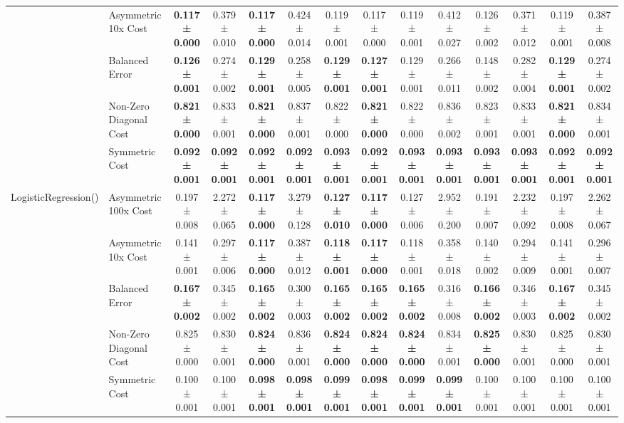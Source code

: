 \begin{table}[H]
{\begin{tabular}{llcccccccccccc}
 & Asymmetric 10x Cost & \textbf{0.117 ± 0.000} & 0.379 ± 0.010 & \textbf{0.117 ± 0.000} & 0.424 ± 0.014 & 0.119 ± 0.001 & 0.117 ± 0.000 & 0.119 ± 0.001 & 0.412 ± 0.027 & 0.126 ± 0.002 & 0.371 ± 0.012 & 0.119 ± 0.001 & 0.387 ± 0.008 \\
 & Balanced Error & \textbf{0.126 ± 0.001} & 0.274 ± 0.002 & \textbf{0.129 ± 0.001} & 0.258 ± 0.005 & \textbf{0.129 ± 0.001} & \textbf{0.127 ± 0.001} & 0.129 ± 0.001 & 0.266 ± 0.011 & 0.148 ± 0.002 & 0.282 ± 0.004 & \textbf{0.129 ± 0.001} & 0.274 ± 0.002 \\
 & Non-Zero Diagonal Cost & \textbf{0.821 ± 0.000} & 0.833 ± 0.001 & \textbf{0.821 ± 0.000} & 0.837 ± 0.001 & 0.822 ± 0.000 & \textbf{0.821 ± 0.000} & 0.822 ± 0.000 & 0.836 ± 0.002 & 0.823 ± 0.001 & 0.833 ± 0.001 & \textbf{0.821 ± 0.000} & 0.834 ± 0.001 \\
 & Symmetric Cost & \textbf{0.092 ± 0.001} & \textbf{0.092 ± 0.001} & \textbf{0.092 ± 0.001} & \textbf{0.092 ± 0.001} & \textbf{0.093 ± 0.001} & \textbf{0.092 ± 0.001} & \textbf{0.093 ± 0.001} & \textbf{0.093 ± 0.001} & \textbf{0.093 ± 0.001} & \textbf{0.093 ± 0.001} & \textbf{0.092 ± 0.001} & \textbf{0.092 ± 0.001} \\
\cline{1-14}
\multirow[t]{5}{*}{LogisticRegression()} & Asymmetric 100x Cost & 0.197 ± 0.008 & 2.272 ± 0.065 & \textbf{0.117 ± 0.000} & 3.279 ± 0.128 & \textbf{0.127 ± 0.010} & \textbf{0.117 ± 0.000} & 0.127 ± 0.006 & 2.952 ± 0.200 & 0.191 ± 0.007 & 2.232 ± 0.092 & 0.197 ± 0.008 & 2.262 ± 0.067 \\
 & Asymmetric 10x Cost & 0.141 ± 0.001 & 0.297 ± 0.006 & \textbf{0.117 ± 0.000} & 0.387 ± 0.012 & \textbf{0.118 ± 0.001} & \textbf{0.117 ± 0.000} & 0.118 ± 0.001 & 0.358 ± 0.018 & 0.140 ± 0.002 & 0.294 ± 0.009 & 0.141 ± 0.001 & 0.296 ± 0.007 \\
 & Balanced Error & \textbf{0.167 ± 0.002} & 0.345 ± 0.002 & \textbf{0.165 ± 0.002} & 0.300 ± 0.003 & \textbf{0.165 ± 0.002} & \textbf{0.165 ± 0.002} & \textbf{0.165 ± 0.002} & 0.316 ± 0.008 & \textbf{0.166 ± 0.002} & 0.346 ± 0.003 & \textbf{0.167 ± 0.002} & 0.345 ± 0.002 \\
 & Non-Zero Diagonal Cost & 0.825 ± 0.000 & 0.830 ± 0.001 & \textbf{0.824 ± 0.000} & 0.836 ± 0.001 & \textbf{0.824 ± 0.000} & \textbf{0.824 ± 0.000} & \textbf{0.824 ± 0.000} & 0.834 ± 0.001 & \textbf{0.825 ± 0.000} & 0.830 ± 0.001 & 0.825 ± 0.000 & 0.830 ± 0.001 \\
 & Symmetric Cost & 0.100 ± 0.001 & 0.100 ± 0.001 & \textbf{0.098 ± 0.001} & \textbf{0.098 ± 0.001} & \textbf{0.099 ± 0.001} & \textbf{0.098 ± 0.001} & \textbf{0.099 ± 0.001} & \textbf{0.099 ± 0.001} & 0.100 ± 0.001 & 0.100 ± 0.001 & 0.100 ± 0.001 & 0.100 ± 0.001 \\

\end{tabular}}
\end{table}
